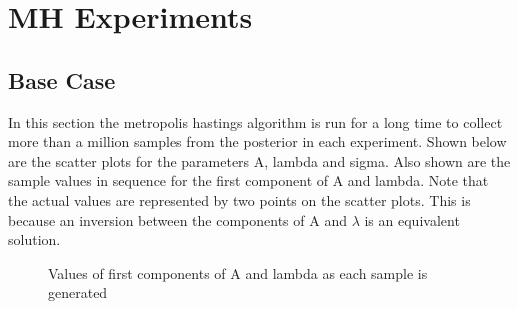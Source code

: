 \documentclass{article}
\begin{document}
\newpage
\section{MH Experiments} %

\subsection{Base Case} %
In this section the metropolis hastings algorithm is run for a long time to collect more than a million samples from the posterior in each experiment. Shown below are the scatter plots for the parameters A, lambda and sigma. Also shown are the sample values in sequence for the first component of A and lambda. Note that the actual values are represented by two points on the scatter plots. This is because an inversion between the components of A and $\lambda$ is an equivalent solution.

\begin{figure}[H]
	\centerline{
		}
	\caption{Values of first components of A and lambda as each sample is generated}
	\label{1.fig:r1_seq}
\end{figure}
\end{document}
